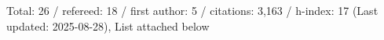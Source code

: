 Total: 26 / refereed: 18 / first author: 5 / citations: 3,163 / h-index: 17 (Last updated: 2025-08-28), List attached below
